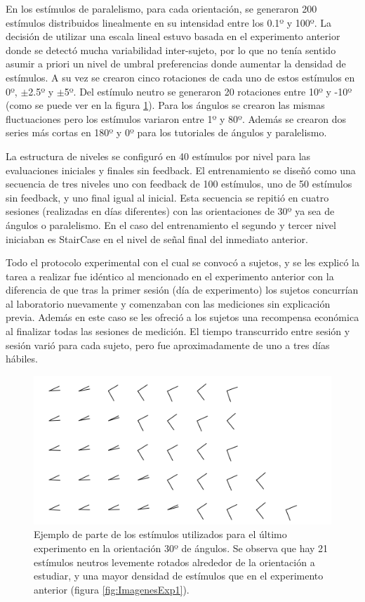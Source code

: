 \documentclass{article}
\numberwithin{figure}{section}
\begin{document}
    En los estímulos de paralelismo, para cada orientación, se generaron 200 estímulos distribuidos linealmente en su intensidad entre los 0.1º y 100º. La decisión de utilizar una escala lineal estuvo basada en el experimento anterior donde se detectó mucha variabilidad inter-sujeto, por lo que no tenía sentido asumir a priori un nivel de umbral preferencias donde aumentar la densidad de estímulos. A su vez se crearon cinco rotaciones de cada uno de estos estímulos en 0º, $\pm$2.5º y $\pm$5º. Del estímulo neutro se generaron 20 rotaciones entre 10º y -10º (como se puede ver en la figura \ref{fig:ImagenesExp2}). Para los ángulos se crearon las mismas fluctuaciones pero los estímulos variaron entre 1º y 80º. Además se crearon dos series más cortas en 180º y 0º para los tutoriales de ángulos y paralelismo. 
    
    La estructura de niveles se configuró en 40 estímulos por nivel para las evaluaciones iniciales y finales sin feedback. El entrenamiento se diseñó como una secuencia de tres niveles uno con feedback de 100 estímulos, uno de 50 estímulos sin feedback, y uno final igual al inicial. Esta secuencia se repitió en cuatro sesiones (realizadas en días diferentes) con las orientaciones de 30º ya sea de ángulos o paralelismo. En el caso del entrenamiento el segundo y tercer nivel iniciaban es StairCase en el nivel de señal final del inmediato anterior. 
    
    Todo el protocolo experimental con el cual se convocó a sujetos, y se les explicó la tarea a realizar fue idéntico al mencionado en el experimento anterior con la diferencia de que tras la primer sesión (día de experimento) los sujetos concurrían al laboratorio nuevamente y comenzaban con las mediciones sin explicación previa. Además en este caso se les ofreció a los sujetos una recompensa económica al finalizar todas las sesiones de medición. El tiempo transcurrido entre sesión y sesión varió para cada sujeto, pero fue aproximadamente de uno a tres días hábiles. 
    
    \begin{figure}
        \center
        \includegraphics[width=\textwidth]{Imagenes/ImagenesExp2.png}
        \caption{Ejemplo de parte de los estímulos utilizados para el último experimento en la orientación 30º de ángulos. Se observa que hay 21 estímulos neutros levemente rotados alrededor de la orientación a estudiar, y una mayor densidad de estímulos que en el experimento anterior (figura \ref{fig:ImagenesExp1}).}
        \label{fig:ImagenesExp2}
    \end{figure}  
    
\end{document}
